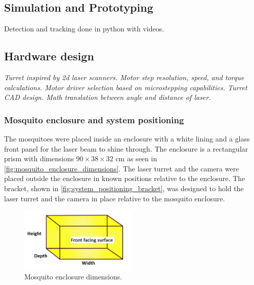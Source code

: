 \subsection{Simulation and Prototyping}
Detection and tracking done in python with videos.


\subsection{Hardware design}
\textit{Turret inspired by 2d laser scanners. Motor step resolution, speed, and torque calculations. Motor driver selection based on microstepping capabilities. Turret CAD design. Math translation between angle and distance of laser.}

\subsubsection{Mosquito enclosure and system positioning}
\newcommand{\enclosureWidthCM}{90} %
\newcommand{\enclosureHeightCM}{38} %
\newcommand{\enclosureDepthCM}{32} %

The mosquitoes were placed inside an enclosure with a white lining and a glass front panel for the laser beam to shine through. The enclosure is a rectangular prism with dimensions $\enclosureWidthCM \times \enclosureHeightCM \times \enclosureDepthCM$ cm as seen in \autoref{fig:mosquito_enclosure_dimensions}. The laser turret and the camera were placed outside the enclosure in known positions relative to the enclosure. The bracket, shown in \autoref{fig:system_positioning_bracket}, was designed to hold the laser turret and the camera in place relative to the mosquito enclosure.

\begin{figure}[h]
    \centering
    \includegraphics[width=0.5\textwidth]{figures/rectangular_prism.png}
    \caption{Mosquito enclosure dimensions.}
    \label{fig:mosquito_enclosure_dimensions}
\end{figure}

